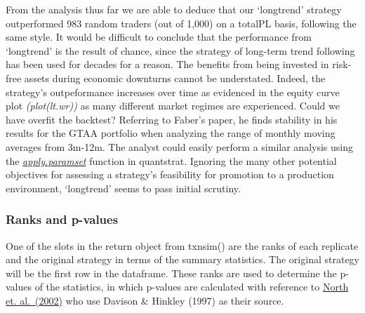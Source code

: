 From the analysis thus far we are able to deduce that our `longtrend'
strategy outperformed 983 random traders (out of 1,000) on a totalPL
basis, following the same style. It would be difficult to conclude that
the performance from `longtrend' is the result of chance, since the
strategy of long-term trend following has been used for decades for a
reason. The benefits from being invested in risk-free assets during
economic downturns cannot be understated. Indeed, the strategy's
outpeformance increases over time as evidenced in the equity curve plot
\emph{(plot(lt.wr))} as many different market regimes are experienced.
Could we have overfit the backtest? Referring to Faber's paper, he finds
stability in his results for the GTAA portfolio when analyzing the range
of monthly moving averages from 3m-12m. The analyst could easily perform
a similar analysis using the
\href{https://github.com/braverock/quantstrat/blob/master/R/paramsets.R}{\emph{apply.paramset}}
function in quantstrat. Ignoring the many other potential objectives for
assessing a strategy's feasibility for promotion to a production
environment, `longtrend' seems to pass initial scrutiny.

\hypertarget{ranks-and-p-values}{%
\subsubsection{Ranks and p-values}\label{ranks-and-p-values}}

One of the slots in the return object from txnsim() are the ranks of
each replicate and the original strategy in terms of the summary
statistics. The original strategy will be the first row in the
dataframe. These ranks are used to determine the p-values of the
statistics, in which p-values are calculated with reference to
\href{https://www.ncbi.nlm.nih.gov/pmc/articles/PMC379178/}{North et.
al.~(2002)} who use Davison \& Hinkley (1997) as their source.

